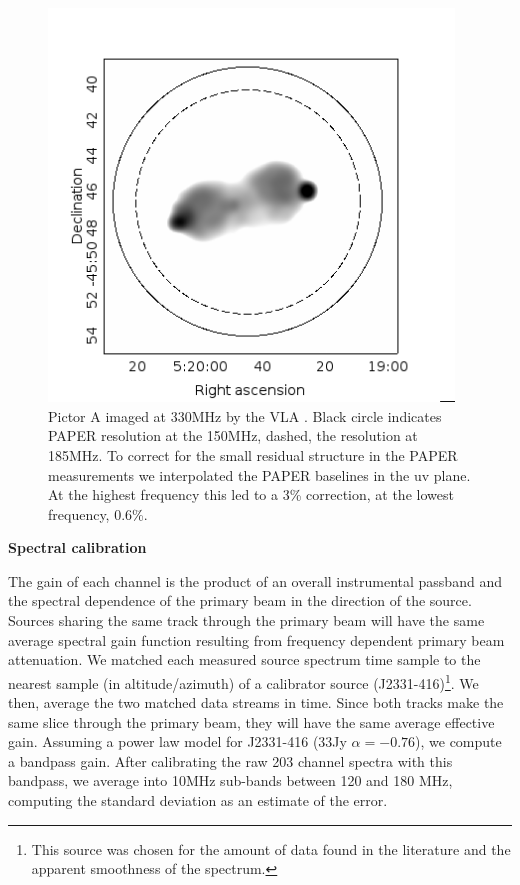 \documentclass[preprint]{aastex}
\begin{document}
\begin{figure}
\includegraphics[width=0.96\textwidth]{plots/picA_Perley.png}
\caption{
Pictor A imaged at 330MHz by the VLA \citep{Perley:1997p9312}. Black circle
indicates PAPER resolution at the 150MHz, dashed, the resolution at 185MHz.  To
correct for the small residual structure in the PAPER measurements we
interpolated the PAPER baselines in the uv plane. At the highest frequency this
led to a 3\% correction, at the lowest frequency, 0.6\%.
\label{fig:pic_perley}}
\end{figure}

\textbf{Spectral calibration}\\
\label{sec:Calibration}


The gain of each channel is the product of an overall instrumental passband and
the spectral dependence of the primary beam in the direction of the source.
Sources sharing the same track through the primary beam will have the same
average spectral gain function resulting from frequency dependent primary beam
attenuation.   We matched each measured source spectrum time sample to the
nearest sample (in altitude/azimuth) of a calibrator source
(J2331-416)\footnote{This source was chosen for the amount of data found in the
literature and the apparent smoothness of the spectrum.}.  We then, average the
two matched data streams in time.  Since both tracks make the same slice
through the primary beam, they will have the same average effective gain.
Assuming a power law model for J2331-416 (33Jy $\alpha=-0.76$), we compute a
bandpass gain.  After calibrating the raw 203 channel spectra with this
bandpass, we average into 10MHz sub-bands between 120 and 180 MHz, computing
the standard deviation as an estimate of the error. 
\end{document}
